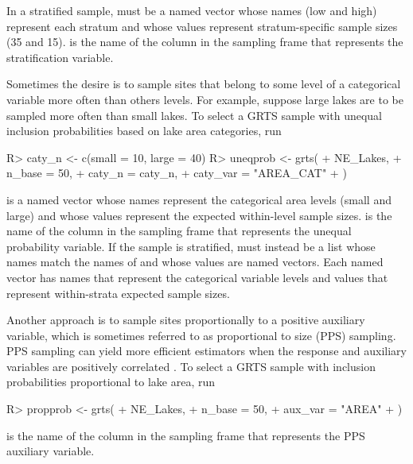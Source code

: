 \documentclass[
  shortnames]{jss}
\begin{document}
In a stratified sample,  must be a named vector whose names
(low and high) represent each stratum and whose values represent
stratum-specific sample sizes (35 and 15).  is the
name of the column in the sampling frame that represents the
stratification variable.

Sometimes the desire is to sample sites that belong to some level of a
categorical variable more often than others levels. For example, suppose
large lakes are to be sampled more often than small lakes. To select a
GRTS sample with unequal inclusion probabilities based on lake area
categories, run

\begin{CodeChunk}
\begin{CodeInput}
R> caty_n <- c(small = 10, large = 40)
R> uneqprob <- grts(
+   NE_Lakes,
+   n_base = 50,
+   caty_n = caty_n,
+   caty_var = "AREA_CAT"
+ )
\end{CodeInput}
\end{CodeChunk}

 is a named vector whose names represent the categorical
area levels (small and large) and whose values represent the expected
within-level sample sizes.  is the name of the column in
the sampling frame that represents the unequal probability variable. If
the sample is stratified,  must instead be a list whose
names match the names of  and whose values are named
vectors. Each named vector has names that represent the categorical
variable levels and values that represent within-strata expected sample
sizes.

Another approach is to sample sites proportionally to a positive
auxiliary variable, which is sometimes referred to as proportional to
size (PPS) sampling. PPS sampling can yield more efficient estimators
when the response and auxiliary variables are positively correlated
\citet{sarndal2003model}. To select a GRTS sample with inclusion
probabilities proportional to lake area, run

\begin{CodeChunk}
\begin{CodeInput}
R> propprob <- grts(
+   NE_Lakes,
+   n_base = 50,
+   aux_var = "AREA"
+ )
\end{CodeInput}
\end{CodeChunk}

 is the name of the column in the sampling frame that
represents the PPS auxiliary variable.
\end{document}
